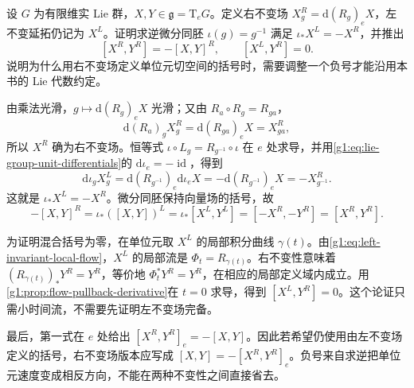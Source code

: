 \begin{exercise}\label{g1:ex:right-invariant-bracket-sign}
	设 \(G\) 为有限维实 Lie 群，\(X,Y\in\mathfrak g=\mathrm{T}_eG\)。定义右不变场 \(X^R_g=\mathrm{d}(R_g)_eX\)，左不变延拓仍记为 \(X^L\)。证明求逆微分同胚 \(\iota(g)=g^{-1}\) 满足 \(\iota_*X^L=-X^R\)，并推出
	\[
		[X^R,Y^R]=-[X,Y]^R,\qquad [X^L,Y^R]=0.
	\]
	说明为什么用右不变场定义单位元切空间的括号时，需要调整一个负号才能沿用本书的 Lie 代数约定。
\end{exercise}
\begin{solution}
	由乘法光滑，\(g\mapsto\mathrm{d}(R_g)_eX\) 光滑；又由 \(R_a\circ R_g=R_{ga}\)，
	\[
		\mathrm{d}(R_a)_gX^R_g=\mathrm{d}(R_{ga})_eX=X^R_{ga},
	\]
	所以 \(X^R\) 确为右不变场。恒等式 \(\iota\circ L_g=R_{g^{-1}}\circ\iota\) 在 \(e\) 处求导，并用\eqref{g1:eq:lie-group-unit-differentials}的 \(\mathrm{d}\iota_e=-\operatorname{id}\)，得到
	\[
		\mathrm{d}\iota_gX^L_g
		=\mathrm{d}(R_{g^{-1}})_e\mathrm{d}\iota_eX
		=-\mathrm{d}(R_{g^{-1}})_eX=-X^R_{g^{-1}}.
	\]
	这就是 \(\iota_*X^L=-X^R\)。微分同胚保持向量场的括号，故
	\[
		-[X,Y]^R
		=\iota_*([X,Y])^L
		=\iota_*[X^L,Y^L]
		=[-X^R,-Y^R]=[X^R,Y^R].
	\]

	为证明混合括号为零，在单位元取 \(X^L\) 的局部积分曲线 \(\gamma(t)\)。由\eqref{g1:eq:left-invariant-local-flow}，\(X^L\) 的局部流是 \(\Phi_t=R_{\gamma(t)}\)。右不变性意味着 \((R_{\gamma(t)})_*Y^R=Y^R\)，等价地 \(\Phi_t^*Y^R=Y^R\)，在相应的局部定义域内成立。用\cref{g1:prop:flow-pullback-derivative}在 \(t=0\) 求导，得到 \([X^L,Y^R]=0\)。这个论证只需小时间流，不需要先证明左不变场完备。

	最后，第一式在 \(e\) 处给出 \([X^R,Y^R]_e=-[X,Y]\)。因此若希望仍使用由左不变场定义的括号，右不变场版本应写成 \([X,Y]=-[X^R,Y^R]_e\)。负号来自求逆把单位元速度变成相反方向，不能在两种不变性之间直接省去。
\end{solution}

